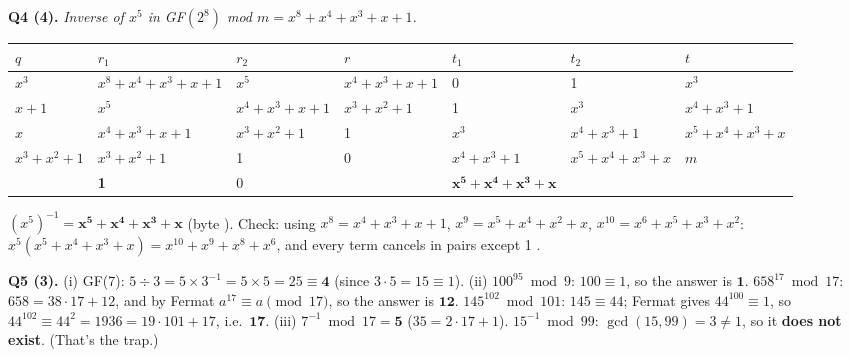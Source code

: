 \textbf{Q4 (4).} \emph{Inverse of $x^5$ in GF$(2^8)$ mod $m = x^8 + x^4 + x^3 + x + 1$.}
\begin{center}\small\setlength{\tabcolsep}{3pt}
\begin{tabular}{@{}lllllll@{}}
\toprule
$q$ & $r_1$ & $r_2$ & $r$ & $t_1$ & $t_2$ & $t$\\
\midrule
$x^3$ & $x^8{+}x^4{+}x^3{+}x{+}1$ & $x^5$ & $x^4{+}x^3{+}x{+}1$ & 0 & 1 & $x^3$\\
$x{+}1$ & $x^5$ & $x^4{+}x^3{+}x{+}1$ & $x^3{+}x^2{+}1$ & 1 & $x^3$ & $x^4{+}x^3{+}1$\\
$x$ & $x^4{+}x^3{+}x{+}1$ & $x^3{+}x^2{+}1$ & 1 & $x^3$ & $x^4{+}x^3{+}1$ & $x^5{+}x^4{+}x^3{+}x$\\
$x^3{+}x^2{+}1$ & $x^3{+}x^2{+}1$ & 1 & 0 & $x^4{+}x^3{+}1$ & $x^5{+}x^4{+}x^3{+}x$ & $m$\\
 & \textbf{1} & 0 & & $\mathbf{x^5{+}x^4{+}x^3{+}x}$ & & \\
\bottomrule
\end{tabular}
\end{center}
$(x^5)^{-1} = \mathbf{x^5 + x^4 + x^3 + x}$ (byte ).
Check: using $x^8 = x^4{+}x^3{+}x{+}1$, $x^9 = x^5{+}x^4{+}x^2{+}x$, $x^{10} = x^6{+}x^5{+}x^3{+}x^2$:
$x^5(x^5{+}x^4{+}x^3{+}x) = x^{10}{+}x^9{+}x^8{+}x^6$, and every term cancels in pairs except 1 \checkmark.

\textbf{Q5 (3).}
(i) GF(7): $5 \div 3 = 5 \times 3^{-1} = 5 \times 5 = 25 \equiv \mathbf{4}$ (since $3 \cdot 5 = 15 \equiv 1$).
(ii) $100^{95} \bmod 9$: $100 \equiv 1$, so the answer is $\mathbf{1}$.
$658^{17} \bmod 17$: $658 = 38\cdot17 + 12$, and by Fermat $a^{17} \equiv a \pmod{17}$, so the answer is $\mathbf{12}$.
$145^{102} \bmod 101$: $145 \equiv 44$; Fermat gives $44^{100} \equiv 1$, so $44^{102} \equiv 44^2 = 1936 = 19\cdot101 + 17$, i.e.\ $\mathbf{17}$.
(iii) $7^{-1} \bmod 17 = \mathbf{5}$ ($35 = 2\cdot17 + 1$). $15^{-1} \bmod 99$: $\gcd(15, 99) = 3 \ne 1$, so it \textbf{does not exist}. (That's the trap.)

